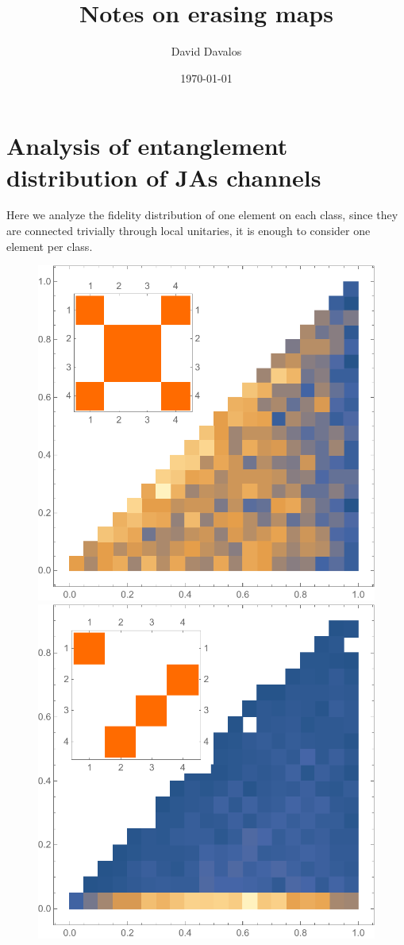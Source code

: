 \documentclass[letterpaper,12pt]{article} %
\author{David Davalos}
\date{\today}
\title{Notes on erasing maps}
\newcommand{\<}{\langle}
\begin{document}
 
\maketitle
\tableofcontents
\newpage
\section{Analysis of entanglement distribution of JAs channels}
Here we analyze the fidelity distribution of one element on each class, since they are connected trivially through local unitaries, it is enough to consider  one element per class.
\begin{figure}[H]
\centering
\includegraphics[scale=0.5]{distro_1.pdf}
\includegraphics[scale=0.5]{distro_2.pdf}

\end{figure}
\end{document}
